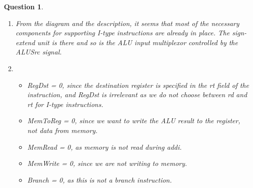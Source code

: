 \documentclass{article}
\theoremstyle{questionstyle}
\newtheorem{q}{Question}
\begin{document}
\begin{q}\begin{enumerate} \leavevmode
    \item From the diagram and the description, it seems that most of the necessary components for supporting I-type instructions are already in place. The sign-extend unit is there and so is the ALU input multiplexor controlled by the ALUSrc signal.
    \item \begin{itemize}
        \item RegDst = 0, since the destination register is specified in the rt field of the instruction, and RegDst is irrelevant as we do not choose between rd and rt for I-type instructions.
        \item MemToReg = 0, since we want to write the ALU result to the register, not data from memory.
        \item MemRead = 0, as memory is not read during addi.
        \item MemWrite = 0, since we are not writing to memory.
        \item Branch = 0, as this is not a branch instruction.
    \end{itemize}
\end{enumerate}\end{q}
\end{document}
